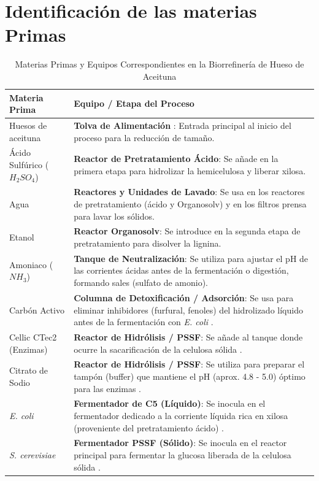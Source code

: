 \documentclass{report}
\begin{document}
\section{Identificación de las materias Primas}
\begin{table}[h]
\centering

\label{tab:materias_primas}
\begin{tabular}{|l|p{8cm}|}
\hline
\textbf{Materia Prima} & \textbf{Equipo / Etapa del Proceso} \\ \hline
Huesos de aceituna & \textbf{Tolva de Alimentación }: Entrada principal al inicio del proceso para la reducción de tamaño. \\ \hline
Ácido Sulfúrico ($H_2SO_4$) & \textbf{Reactor de Pretratamiento Ácido}: Se añade en la primera etapa para hidrolizar la hemicelulosa y liberar xilosa. \\ \hline
Agua & \textbf{Reactores y Unidades de Lavado}: Se usa en los reactores de pretratamiento (ácido y Organosolv) y en los filtros prensa para lavar los sólidos. \\ \hline
Etanol & \textbf{Reactor Organosolv}: Se introduce en la segunda etapa de pretratamiento para disolver la lignina. \\ \hline
Amoniaco ($NH_3$) & \textbf{Tanque de Neutralización}: Se utiliza para ajustar el pH de las corrientes ácidas antes de la fermentación o digestión, formando sales (sulfato de amonio). \\ \hline
Carbón Activo & \textbf{Columna de Detoxificación / Adsorción}: Se usa para eliminar inhibidores (furfural, fenoles) del hidrolizado líquido antes de la fermentación con \textit{E. coli} . \\ \hline
Cellic CTec2 (Enzimas) & \textbf{Reactor de Hidrólisis / PSSF}: Se añade al tanque donde ocurre la sacarificación de la celulosa sólida . \\ \hline
Citrato de Sodio & \textbf{Reactor de Hidrólisis / PSSF}: Se utiliza para preparar el tampón (buffer) que mantiene el pH (aprox. 4.8 - 5.0) óptimo para las enzimas . \\ \hline
\textit{E. coli} & \textbf{Fermentador de C5 (Líquido)}: Se inocula en el fermentador dedicado a la corriente líquida rica en xilosa (proveniente del pretratamiento ácido) . \\ \hline
\textit{S. cerevisiae} & \textbf{Fermentador PSSF (Sólido)}: Se inocula en el reactor principal para fermentar la glucosa liberada de la celulosa sólida . \\ \hline
\end{tabular}
\caption{Materias Primas y Equipos Correspondientes en la Biorrefinería de Hueso de Aceituna}
\end{table}
\end{document}

